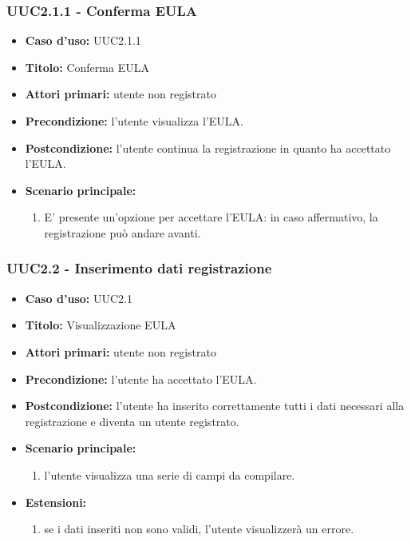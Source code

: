 \documentclass[casi-duso]{subfiles}
\begin{document}
\subsubsection{UUC2.1.1 - Conferma EULA}
\label{subsub:UUC2.1.1utente}
\begin{itemize}
  \item \textbf{Caso d’uso:} UUC2.1.1 
  \item \textbf{Titolo:} Conferma EULA
  \item \textbf{Attori primari:} utente non registrato
  \item \textbf{Precondizione:} l'utente visualizza l'EULA.
  \item \textbf{Postcondizione:} l'utente continua la registrazione in quanto ha accettato l'EULA. 
  \item \textbf{Scenario principale:} 
  \begin{enumerate}
    \item E' presente un'opzione per accettare l'EULA: in caso affermativo, la registrazione può andare avanti. 
  \end{enumerate}    
\end{itemize}

\subsubsection{UUC2.2 - Inserimento dati registrazione}
\label{subsub:UUC2.2utente}
\begin{itemize}
  \item \textbf{Caso d’uso:} UUC2.1 
  \item \textbf{Titolo:} Visualizzazione EULA
  \item \textbf{Attori primari:} utente non registrato
  \item \textbf{Precondizione:} l'utente ha accettato l'EULA.
  \item \textbf{Postcondizione:} l'utente ha inserito correttamente tutti i dati necessari alla registrazione e diventa un utente registrato. 
  \item \textbf{Scenario principale:} 
  \begin{enumerate}
    \item l'utente visualizza una serie di campi da compilare.
  \end{enumerate}
  \item \textbf{Estensioni:} 
  \begin{enumerate}
    \item se i dati inseriti non sono validi, l'utente visualizzerà un errore.
  \end{enumerate}     
\end{itemize}
\end{document}
